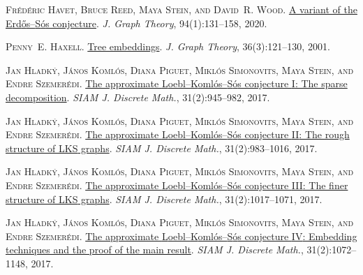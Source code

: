 \documentclass[a4paper,11pt]{article}
\begin{document}
\begin{thebibliography}{44}
\textsc{Fr{\'e}d{\'e}ric Havet, Bruce Reed, Maya Stein, and David~R. Wood}.
\newblock \href{https://doi.org/10.1002/jgt.22511}{A variant of the
  {E}rd{\H{o}}s--{S}{\'o}s conjecture}.
\newblock \emph{J. Graph Theory}, 94(1):131--158, 2020.

\textsc{Penny~E. Haxell}.
\newblock
  \href{https://doi.org/10.1002/1097-0118(200103)36:3<121::AID-JGT1000>3.0.CO;2-U}{Tree
  embeddings}.
\newblock \emph{J. Graph Theory}, 36(3):121--130, 2001.

\textsc{Jan Hladk{\'y}, J{\'a}nos Koml{\'o}s, Diana Piguet, Mikl{\'o}s
  Simonovits, Maya Stein, and Endre Szemer{\'e}di}.
\newblock \href{https://doi.org/10.1137/140982842}{The approximate
  {L}oebl--{K}oml{\'o}s--{S}{\'o}s conjecture {I}: The sparse decomposition}.
\newblock \emph{SIAM J. Discrete Math.}, 31(2):945--982, 2017{}.

\textsc{Jan Hladk{\'y}, J{\'a}nos Koml{\'o}s, Diana Piguet, Mikl{\'o}s
  Simonovits, Maya Stein, and Endre Szemer{\'e}di}.
\newblock \href{https://doi.org/10.1137/140982854}{The approximate
  {L}oebl--{K}oml{\'o}s--{S}{\'o}s conjecture {II}: The rough structure of
  {LKS} graphs}.
\newblock \emph{SIAM J. Discrete Math.}, 31(2):983--1016, 2017{}.

\textsc{Jan Hladk{\'y}, J{\'a}nos Koml{\'o}s, Diana Piguet, Mikl{\'o}s
  Simonovits, Maya Stein, and Endre Szemer{\'e}di}.
\newblock \href{https://doi.org/10.1137/140982866}{The approximate
  {L}oebl--{K}oml{\'o}s--{S}{\'o}s conjecture {III}: The finer structure of
  {LKS} graphs}.
\newblock \emph{SIAM J. Discrete Math.}, 31(2):1017--1071, 2017{}.

\textsc{Jan Hladk{\'y}, J{\'a}nos Koml{\'o}s, Diana Piguet, Mikl{\'o}s
  Simonovits, Maya Stein, and Endre Szemer{\'e}di}.
\newblock \href{https://doi.org/10.1137/140982878}{The approximate
  {L}oebl--{K}oml{\'o}s--{S}{\'o}s conjecture {IV}: Embedding techniques and
  the proof of the main result}.
\newblock \emph{SIAM J. Discrete Math.}, 31(2):1072--1148, 2017{}.


\end{thebibliography}
\end{document}
